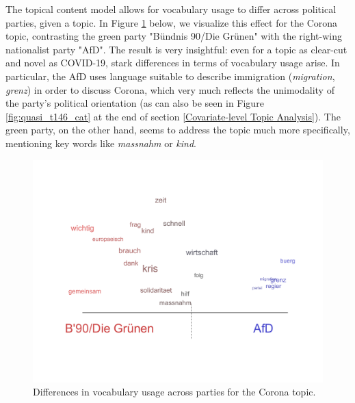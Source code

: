 The topical content model allows for vocabulary usage to differ across political parties, given a topic. In Figure \ref{fig:t8_vocab_parties} below, we visualize this effect for the Corona topic, contrasting the green party "Bündnis 90/Die Grünen" with the right-wing nationalist party "AfD". The result is very insightful: even for a topic as clear-cut and novel as COVID-19, stark differences in terms of vocabulary usage arise. In particular, the AfD uses language suitable to describe immigration (\textit{migration}, \textit{grenz}) in order to discuss Corona, which very much reflects the unimodality of the party's political orientation (as can also be seen in Figure \ref{fig:quasi_t146_cat} at the end of section \ref{Covariate-level Topic Analysis}). The green party, on the other hand, seems to address the topic much more specifically, mentioning key words like \textit{massnahm} or \textit{kind}.

\begin{figure}[h!]
  \centering
  \captionsetup{justification=centering,margin=2cm}
  \includegraphics[scale = 0.5]{../plots/5_2/t8_vocab_parties.pdf}
  \caption{Differences in vocabulary usage across parties for the Corona topic.}
  \label{fig:t8_vocab_parties}
\end{figure}


